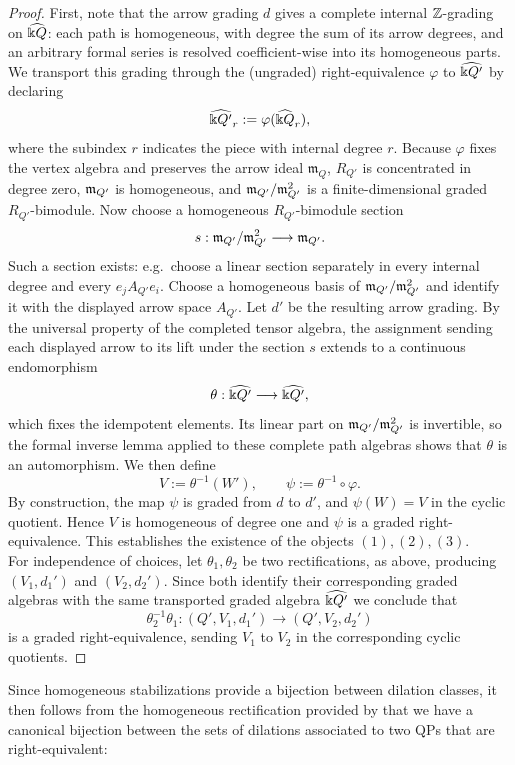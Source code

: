 \begin{proof}
First, note that the arrow grading \(d\) gives a complete internal \(\mathbb Z\)-grading on
\(\widehat{\Bbbk Q}\): each path is homogeneous, with degree the sum of its arrow
degrees, and an arbitrary formal series is resolved coefficient-wise into its
homogeneous parts. We transport this grading through the (ungraded) right-equivalence \(\varphi\) to
\(\widehat{\Bbbk Q'}\) by declaring
\[
 \widehat{\Bbbk Q'}_r:=\varphi(\widehat{\Bbbk Q}_r),
\]
where the subindex $r$ indicates the piece with internal degree $r$. Because \(\varphi\) fixes the vertex algebra and preserves the arrow ideal $\mathfrak{m}_Q$,
\(R_{Q'}\) is concentrated in degree zero, \(\mathfrak m_{Q'}\) is homogeneous, and
\(\mathfrak m_{Q'}/\mathfrak m_{Q'}^2\) is a finite-dimensional graded
\(R_{Q'}\)-bimodule. Now choose a homogeneous \(R_{Q'}\)-bimodule section
\[
 s:\mathfrak m_{Q'}/\mathfrak m_{Q'}^2\longrightarrow\mathfrak m_{Q'}.
\]
Such a section exists: e.g.~choose a linear section separately in every
internal degree and every \(e_jA_{Q'}e_i\).  Choose a homogeneous basis
of \(\mathfrak m_{Q'}/\mathfrak m_{Q'}^2\) and identify it with the displayed arrow space
\(A_{Q'}\).  Let \(d'\) be the resulting arrow grading.  By the universal
property of the completed tensor algebra, the assignment sending each
displayed arrow to its lift under the section \(s\) extends to a continuous endomorphism
\[
 \theta:\widehat{\Bbbk Q'}\longrightarrow \widehat{\Bbbk Q'},
\]
which fixes the idempotent elements. Its linear part on \(\mathfrak m_{Q'}/\mathfrak m_{Q'}^2\) is invertible, so the formal inverse
lemma applied to these complete path algebras shows that \(\theta\) is an automorphism. We then define
\[
 V:=\theta^{-1}(W'),
 \qquad
 \psi:=\theta^{-1}\circ\varphi.
\]
By construction, the map \(\psi\) is graded from \(d\) to \(d'\), and
\(\psi(W)=V\) in the cyclic quotient.  Hence \(V\) is homogeneous of degree
one and \(\psi\) is a graded right-equivalence. This establishes the existence of the objects $(1),(2),(3)$.\\

For independence of choices, let \(\theta_1,\theta_2\) be two rectifications, as above, producing
\((V_1,d_1')\) and \((V_2,d_2')\).  Since both identify their corresponding graded
algebras with the same transported graded algebra \(\widehat{\Bbbk Q'}\) we conclude that
\[
 \theta_2^{-1}\theta_1:(Q',V_1,d_1')\longrightarrow(Q',V_2,d_2')
\]
is a graded right-equivalence, sending $V_1$ to $V_2$ in the corresponding cyclic quotients.
\end{proof}
\color{black}
Since homogeneous stabilizations provide a bijection between dilation classes, it then follows from the homogeneous rectification provided by  that we have a canonical bijection between the sets of dilations associated to two QPs that are right-equivalent:

